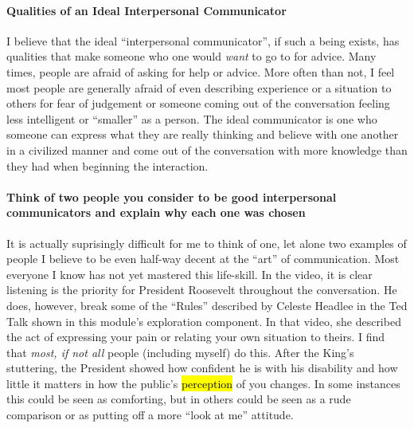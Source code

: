 \documentclass[stu,12pt]{apa7}
\begin{document}
    \paragraph{Qualities of an Ideal Interpersonal Communicator}
      I believe that the ideal ``interpersonal communicator'', if such a being
        exists, has qualities that make someone who one would \textit{want}
        to go to for advice. Many times, people are afraid of asking for help
        or advice. More often than not, I feel most people are generally afraid
        of even describing experience or a situation to others for fear of
        judgement or someone coming out of the conversation feeling less
        intelligent or ``smaller'' as a person. The ideal communicator is one
        who someone can express what they are really thinking and believe with
        one another in a civilized manner and come out of the conversation
        with more knowledge than they had when beginning the interaction.

    \paragraph{Think of two people you consider to be good interpersonal
      communicators and explain why each one was chosen}
      It is actually suprisingly difficult for me to think of one, let alone
        two examples of people I believe to be even half-way decent at the
        ``art'' of communication. Most everyone I know has not yet mastered
        this life-skill. In the video, it is clear listening is the priority
        for President Roosevelt throughout the conversation. He does, however,
        break some of the ``Rules'' described by Celeste Headlee in the Ted Talk
        shown in this module's exploration component. In that video, she
        described the act of expressing your pain or relating your own situation
        to theirs. I find that \emph{most, if not all} people (including myself)
        do this. After the King's stuttering, the President showed how confident
        he is with his disability and how little it matters in how the public's
        \hl{perception} of you changes. In some instances this could be seen as
        comforting, but in others could be seen as a rude comparison or as
        putting off a more ``look at me'' attitude.

\end{document}
